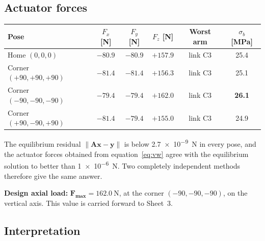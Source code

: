 \documentclass[11pt]{article}
\begin{document}
\subsection{Actuator forces}

\begin{center}
\begin{tabular}{@{}lccccc@{}}
\toprule
\textbf{Pose} & $F_x$ [N] & $F_y$ [N] & $F_z$ [N] & \textbf{Worst arm} & $\sigma_b$ [MPa] \\
\midrule
Home $(0,0,0)$          & $-80.9$ & $-80.9$ & $+157.9$ & link C3 & 25.4 \\
Corner $(+90,+90,+90)$  & $-81.4$ & $-81.4$ & $+156.3$ & link C3 & 25.1 \\
Corner $(-90,-90,-90)$  & $-79.4$ & $-79.4$ & $\bm{+162.0}$ & link C3 & \textbf{26.1} \\
Corner $(+90,-90,+90)$  & $-81.4$ & $-79.4$ & $+155.0$ & link C3 & 24.9 \\
\bottomrule
\end{tabular}
\end{center}

The equilibrium residual $\lVert\bm A\bm x-\bm y\rVert$ is below
\SI{2.7e-9}{\newton} in every pose, and the actuator forces obtained from
equation~\eqref{eq:vw} agree with the equilibrium solution to better than
\SI{1e-6}{\newton}. Two completely independent methods therefore give the same answer.

\textbf{Design axial load:} $\bm{F_{\max}}=\SI{162.0}{\newton}$, at the corner
$(-90,-90,-90)$, on the vertical axis. This value is carried forward to Sheet~3.

\subsection{Interpretation}
\end{document}

